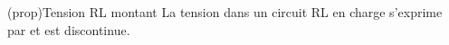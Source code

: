 \documentclass[../../main/main.tex]{subfiles}
\begin{document}
\begin{tcb*}[label=prop:url-charge, sidebyside, righthand ratio=.3]
  (prop){Tension RL montant}
	La tension dans un circuit RL en charge s'exprime par
	\psw{%
		\[
			\boxed{u_L(t) = E\exp \left(-\frac{t}{\tau} \right)}
		\]
	}%
  et est discontinue.
	\tcblower
	\begin{center}
	\end{center}
\end{tcb*}
\end{document}

